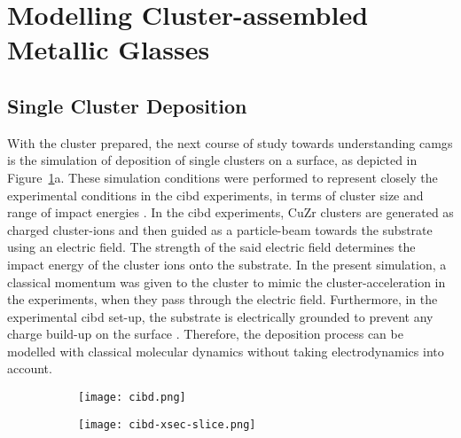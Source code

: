 \section{Modelling Cluster-assembled Metallic Glasses} \label{s:camgdev}
%
\subsection{Single Cluster Deposition}
\begin{changebar}
With the cluster prepared, the next course of study towards understanding \gls{camg}s is the simulation of deposition of single clusters on a surface, as depicted in Figure~\ref{f:cibdsmod}a. These simulation conditions were performed to represent closely the experimental conditions in the \gls{cibd} experiments, in terms of cluster size and range of impact energies \cite{Benel2018,Benel2019}. In the \gls{cibd} experiments, CuZr clusters are generated as charged cluster-ions and then guided as a particle-beam towards the substrate using an electric field. The strength of the said electric field determines the impact energy of the cluster ions onto the substrate.  In the present simulation, a classical momentum was given to the cluster to mimic the cluster-acceleration in the experiments, when they pass through the electric field. Furthermore, in the experimental \gls{cibd} set-up, the substrate is electrically grounded to prevent any charge build-up on the surface \cite{Fischer2015}. Therefore, the deposition process can be modelled with classical molecular dynamics without taking electrodynamics into account. \par

\begin{figure}[h]
	\centering
\begin{subfigure}{0.45\textwidth}
	\texttt{[image: cibd.png]}
	\caption{}
\end{subfigure}%
\hspace{1cm}
\begin{subfigure}{0.45\textwidth}
	\texttt{[image: cibd-xsec-slice.png]}
	\caption{}
\end{subfigure}
\label{f:cibdsmod}
\end{figure} 


\end{changebar}
